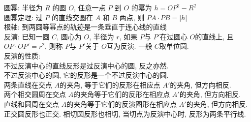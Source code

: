 \noindent
圆幂: 半径为 $R$ 的圆 $O$, 任意一点 $P$ 到 $O$ 的幂为 $h=OP^2-R^2$\\
圆幂定理: 过 $P$ 的直线交圆在 $A$ 和 $B$ 两点, 则 $PA\cdot PB=|h|$\\
根轴: 到两圆等幂点的轨迹是一条垂直于连心线的直线\\
反演: 已知一圆 $C$, 圆心为 $O$, 半径为 $r$, 如果 $P$与 $P'$在过圆心 $O$的直线上, 且 $OP\cdot OP'=r^2$, 则称 $P$与 $P'$关于 $O$互为反演. 一般 $C$取单位圆.\\
反演的性质: \\
不过反演中心的直线反形是过反演中心的圆, 反之亦然.\\
不过反演中心的圆, 它的反形是一个不过反演中心的圆.\\
两条直线在交点 $A$的夹角, 等于它们的反形在相应点 $A'$的夹角, 但方向相反.\\
两个相交圆周在交点 $A$的夹角等于它们的反形在相应点 $A'$的夹角, 但方向相反.\\
直线和圆周在交点 $A$的夹角等于它们的反演图形在相应点 $A'$的夹角, 但方向相反.\\
正交圆反形也正交. 相切圆反形也相切, 当切点为反演中心时, 反形为两条平行线. \\